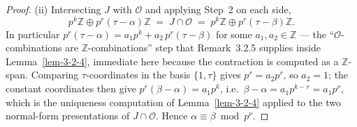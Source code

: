 \begin{proof}
  (ii) Intersecting $J$ with $\mathcal{O}$ and applying Step~2 on each side,
  \[
    p^{k}\mathbb{Z} \oplus p^{r}(\tau - \alpha)\mathbb{Z}
    \;=\; J \cap \mathcal{O}
    \;=\; p^{k}\mathbb{Z} \oplus p^{r}(\tau - \beta)\mathbb{Z}.
  \]
  In particular $p^{r}(\tau - \alpha) = a_1 p^{k} + a_2\, p^{r}(\tau - \beta)$ for
  some $a_1, a_2 \in \mathbb{Z}$ --- the ``$\mathcal{O}$-combinations are
  $\mathbb{Z}$-combinations'' step that Remark~3.2.5 supplies inside
  Lemma~\ref{lem-3-2-4}, immediate here because the contraction is computed as a
  $\mathbb{Z}$-span. Comparing $\tau$-coordinates in the basis $\{1, \tau\}$ gives
  $p^{r} = a_2 p^{r}$, so $a_2 = 1$; the constant coordinates then give
  $p^{r}(\beta - \alpha) = a_1 p^{k}$, i.e.\
  $\beta - \alpha = a_1 p^{k - r} = a_1 p^{\nu}$, which is the uniqueness computation
  of Lemma~\ref{lem-3-2-4} applied to the two normal-form presentations of
  $J \cap \mathcal{O}$. Hence $\alpha \equiv \beta \bmod p^{\nu}$.
\end{proof}

